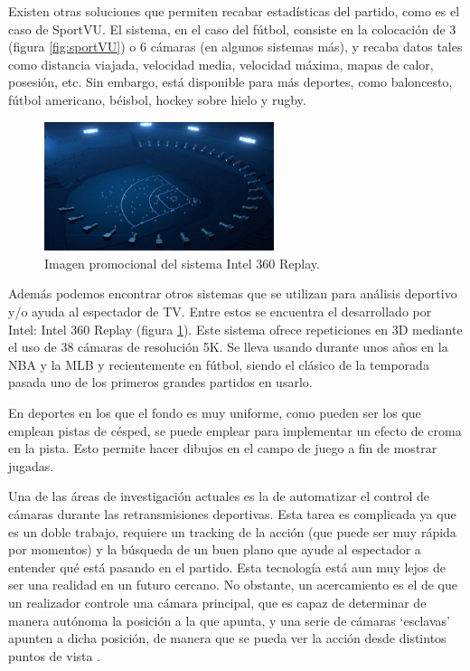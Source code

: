 Existen otras soluciones que permiten recabar estadísticas del partido, como es el caso de SportVU. El sistema, en el caso del fútbol, consiste en la colocación de 3 (figura \ref{fig:sportVU}) o 6 cámaras (en algunos sistemas más), y recaba datos tales como distancia viajada, velocidad media, velocidad máxima, mapas de calor, posesión, etc. Sin embargo, está disponible para más deportes, como baloncesto, fútbol americano, béisbol, hockey sobre hielo y rugby.

\begin{figure}
    \centering
    \includegraphics[width=0.6\textwidth]{images/intel360}
    \caption{Imagen promocional del sistema Intel 360 Replay.}
    \label{fig:intel360}
\end{figure}

Además podemos encontrar otros sistemas que se utilizan para análisis deportivo y/o ayuda al espectador de TV. Entre estos se encuentra el desarrollado por Intel: Intel 360 Replay (figura \ref{fig:intel360}). Este sistema ofrece repeticiones en 3D mediante el uso de 38 cámaras de resolución 5K. Se lleva usando durante unos años en la NBA y la MLB y recientemente en fútbol, siendo el clásico de la temporada pasada uno de los primeros grandes partidos en usarlo.

En deportes en los que el fondo es muy uniforme, como pueden ser los que emplean pistas de césped, se puede emplear para implementar un efecto de croma en la pista. Esto permite hacer dibujos en el campo de juego a fin de mostrar jugadas.

Una de las áreas de investigación actuales es la de automatizar el control de cámaras durante las retransmisiones deportivas. Esta tarea es complicada ya que es un doble trabajo, requiere un tracking de la acción (que puede ser muy rápida por momentos) y la búsqueda de un buen plano que ayude al espectador a entender qué está pasando en el partido. Esta tecnología está aun muy lejos de ser una realidad en un futuro cercano. No obstante, un acercamiento es el de que un realizador controle una cámara principal, que es capaz de determinar de manera autónoma la posición a la que apunta, y una serie de cámaras `esclavas' apunten a dicha posición, de manera que se pueda ver la acción desde distintos puntos de vista \cite{book:cvInSports}.
\newpage
